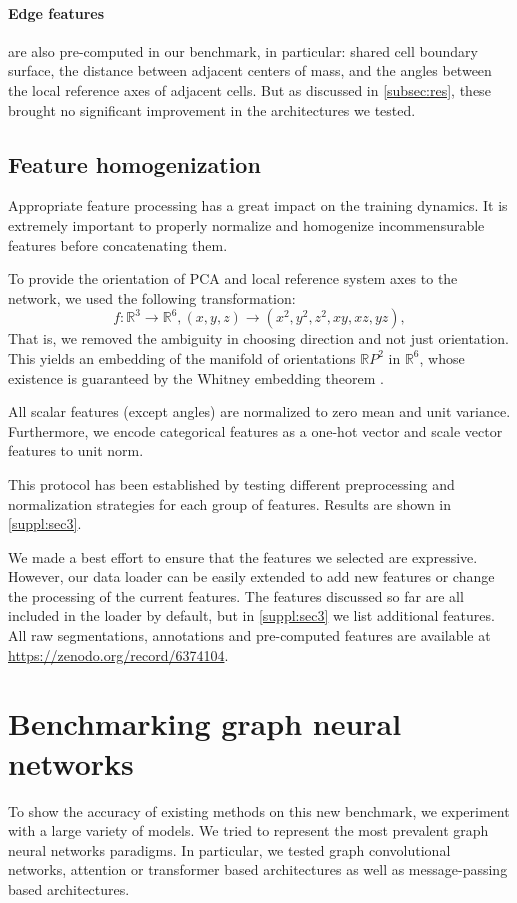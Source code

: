 \documentclass[10pt,twocolumn,letterpaper]{article}
\begin{document}
\paragraph{Edge features} are also pre-computed in our benchmark, in particular: shared cell boundary surface, the distance between adjacent centers of mass, and the angles between the local reference axes of adjacent cells. But as discussed in \cref{subsec:res}, these brought no significant improvement in the architectures we tested.

\subsection{Feature homogenization} 
Appropriate feature processing has a great impact on the training dynamics. It is extremely important to properly normalize and homogenize incommensurable features before concatenating them.

To provide the orientation of PCA and local reference system axes to the network, we used the following transformation: 
\begin{equation*}
f: \mathbb{R}^3 \rightarrow \mathbb{R}^6, \left( x, y, z \right) \rightarrow \left( x^2, y^2, z^2, xy, xz, yz \right),    
\end{equation*}
That is, we removed the ambiguity in choosing direction and not just orientation. This yields an embedding of the manifold of orientations ${\mathbb{R}P}^2$ in $\mathbb{R}^6$, whose existence is guaranteed by the Whitney embedding theorem \cite{whitney1944self, adachi2012embeddings}.

All scalar features (except angles) are normalized to zero mean and unit variance. Furthermore, we encode categorical features as a one-hot vector and scale vector features to unit norm.

This protocol has been established by testing different preprocessing and normalization strategies for each group of features. Results are shown in \cref{suppl:sec3}.

We made a best effort to ensure that the features we selected are expressive. However, our data loader can be easily extended to add new features or change the processing of the current features. The features discussed so far are all included in the loader by default, but in \cref{suppl:sec3} we list additional features. All raw segmentations, annotations and pre-computed features are available at \url{https://zenodo.org/record/6374104}.

\section{Benchmarking graph neural networks}
\label{sec:baseline}
To show the accuracy of existing methods on this new benchmark, we experiment with a large variety of models. We tried to represent the most prevalent graph neural networks paradigms. In particular, we tested graph convolutional networks, attention or transformer based architectures as well as message-passing based architectures.
\end{document}
